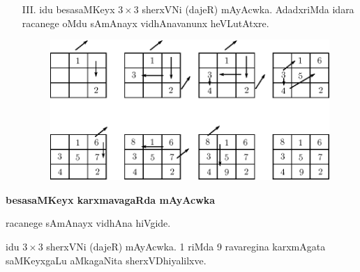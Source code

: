 \begin{enumerate}
\item[{\rm III.}] idu besasaMKeyx $3\times 3$ sherxVNi (dajeR) mAyAcwka. AdadxriMda idara racanege oMdu sAmAnayx vidhAnavanunx heVLutAtxre.
\begin{figure}[H]
\centering
\includegraphics[scale=.8]{src/figures/m_117a.eps}
\end{figure}
\end{enumerate}

{\bf besasaMKeyx karxmavagaRda mAyAcwka}

racanege sAmAnayx vidhAna hiVgide.

idu $3\times 3$ sherxVNi (dajeR) mAyAcwka. {\rm 1} riMda {\rm 9} ravaregina karxmAgata saMKeyxgaLu aMkagaNita sherxVDhiyalilxve.

